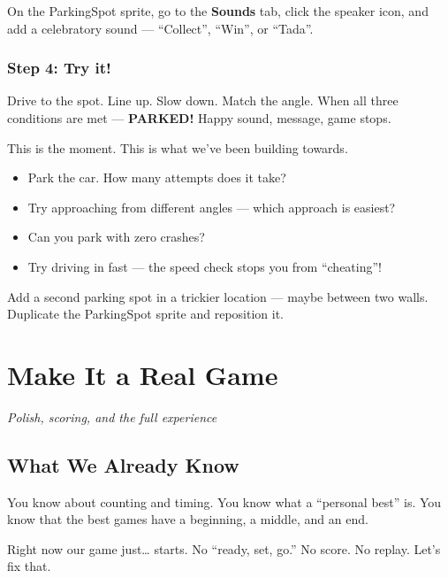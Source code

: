 \documentclass[11pt,a4paper]{article}
\begin{document}
On the ParkingSpot sprite, go to the \textbf{Sounds} tab, click the speaker icon, and add a celebratory sound --- ``Collect'', ``Win'', or ``Tada''.

\subsubsection{Step 4: Try it!}

Drive to the spot. Line up. Slow down. Match the angle. When all three conditions are met --- \textbf{PARKED!} Happy sound, message, game stops.

This is the moment. This is what we've been building towards.

\begin{challengebox}
\begin{itemize}[nosep]
  \item Park the car. How many attempts does it take?
  \item Try approaching from different angles --- which approach is easiest?
  \item Can you park with zero crashes?
  \item Try driving in fast --- the speed check stops you from ``cheating''!
\end{itemize}
\end{challengebox}

\begin{stretchbox}
Add a second parking spot in a trickier location --- maybe between two walls. Duplicate the ParkingSpot sprite and reposition it.
\end{stretchbox}

\newpage

\section{Make It a Real Game}
\textit{\large Polish, scoring, and the full experience}

\subsection{What We Already Know}

You know about counting and timing. You know what a ``personal best'' is. You know that the best games have a beginning, a middle, and an end.

Right now our game just\ldots{} starts. No ``ready, set, go.'' No score. No replay. Let's fix that.
\end{document}

